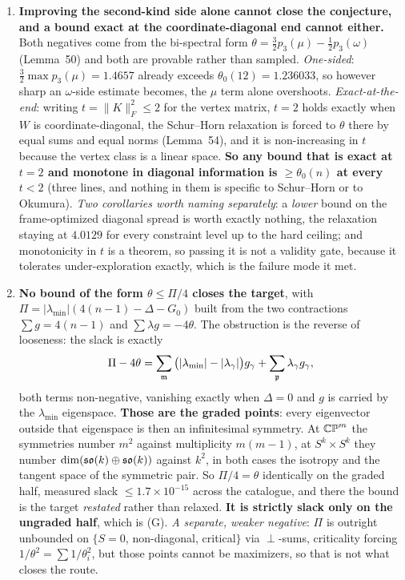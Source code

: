 \begin{enumerate}[leftmargin=1.8em]
\item \textbf{Improving the second-kind side alone cannot close the conjecture, and a bound exact at the coordinate-diagonal end cannot either.} Both negatives come from the bi-spectral form $\theta=\tfrac32p_3(\mu)-\tfrac12p_3(\omega)$ (Lemma~50) and both are provable rather than sampled. \emph{One-sided}: $\tfrac32\max p_3(\mu)=1.4657$ already exceeds $\theta_0(12)=1.236033$, so however sharp an $\omega$-side estimate becomes, the $\mu$ term alone overshoots. \emph{Exact-at-the-end}: writing $t=\|K\|_F^2\le2$ for the vertex matrix, $t=2$ holds exactly when $W$ is coordinate-diagonal, the Schur--Horn relaxation is forced to $\theta$ there by equal sums and equal norms (Lemma~54), and it is non-increasing in $t$ because the vertex class is a linear space. \textbf{So any bound that is exact at $t=2$ and monotone in diagonal information is $\ge\theta_0(n)$ at every $t<2$} (three lines, and nothing in them is specific to Schur--Horn or to Okumura). \emph{Two corollaries worth naming separately}: a \emph{lower} bound on the frame-optimized diagonal spread is worth exactly nothing, the relaxation staying at $4.0129$ for every constraint level up to the hard ceiling; and monotonicity in $t$ is a theorem, so passing it is not a validity gate, because it tolerates under-exploration exactly, which is the failure mode it met.

\item \textbf{No bound of the form $\theta\le\Pi/4$ closes the target}, with $\Pi=|\lambda_{\min}|(4(n-1)-\Delta-G_0)$ built from the two contractions $\sum g=4(n-1)$ and $\sum\lambda g=-4\theta$. The obstruction is the reverse of looseness: the slack is exactly
\[
\Pi-4\theta=\sum_{\mathfrak{m}}\big(|\lambda_{\min}|-|\lambda_\gamma|\big)g_\gamma+\sum_{\mathfrak p}\lambda_\gamma g_\gamma,
\]
both terms non-negative, vanishing exactly when $\Delta=0$ and $g$ is carried by the $\lambda_{\min}$ eigenspace. \textbf{Those are the graded points}: every eigenvector outside that eigenspace is then an infinitesimal symmetry. At $\mathbb{CP}^m$ the symmetries number $m^2$ against multiplicity $m(m-1)$, at $S^k\times S^k$ they number $\dim(\mathfrak{so}(k)\oplus\mathfrak{so}(k))$ against $k^2$, in both cases the isotropy and the tangent space of the symmetric pair. So $\Pi/4=\theta$ identically on the graded half, measured slack $\le1.7\times10^{-15}$ across the catalogue, and there the bound is the target \emph{restated} rather than relaxed. \textbf{It is strictly slack only on the ungraded half}, which is (G). \emph{A separate, weaker negative}: $\Pi$ is outright unbounded on $\{S=0$, non-diagonal, critical$\}$ via $\perp$-sums, criticality forcing $1/\theta^2=\sum1/\theta_i^2$, but those points cannot be maximizers, so that is not what closes the route.


\end{enumerate}
